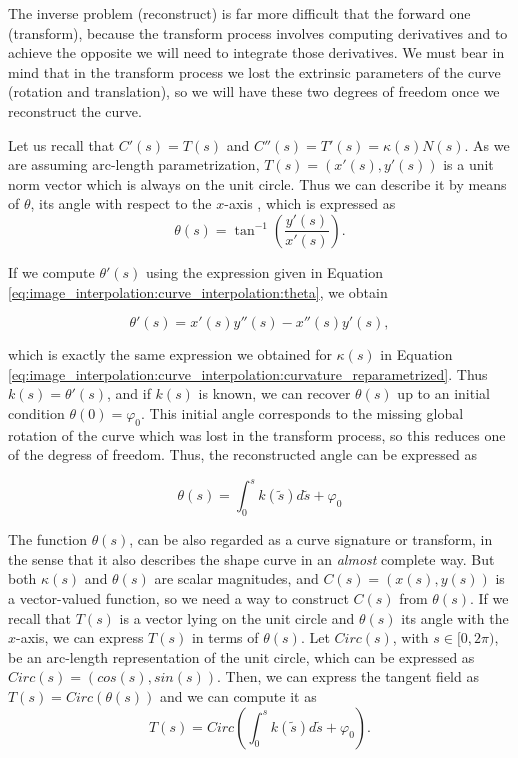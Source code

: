 \documentclass{ipol}
\begin{document}
The inverse problem (reconstruct) is far more difficult that the forward one (transform), because the transform process involves computing derivatives and to achieve the opposite we will need to integrate those derivatives. We must bear in mind that in the transform process we lost the extrinsic parameters of the curve (rotation and translation), so we will have these two degrees of freedom once we reconstruct the curve.

Let us recall that $C'(s)=T(s)$ and $C''(s)=T'(s)=\kappa(s)N(s)$. As we are assuming arc-length parametrization, $T(s)=(x'(s),y'(s))$ is a unit norm vector which is always on the unit circle. Thus we can describe it by means of $\theta$,  its angle with respect to the $x$-axis , which is expressed as
\begin{equation}
 \theta(s)=\tan^{-1}\left(\frac{y'(s)}{x'(s)}\right).
 \label{eq:image_interpolation:curve_interpolation:theta}
\end{equation}

If we compute $\theta'(s)$ using the expression given in Equation \ref{eq:image_interpolation:curve_interpolation:theta}, we obtain

\begin{equation}
 \theta'(s)=x'(s)y''(s)-x''(s)y'(s) ,
 \label{eq:image_interpolation:curve_interpolation:theta_prime}
\end{equation}

which is exactly the same expression we obtained for $\kappa(s)$ in Equation \ref{eq:image_interpolation:curve_interpolation:curvature_reparametrized}. Thus $k(s)=\theta'(s)$, and if $k(s)$ is known, we can recover $\theta(s)$ up to an initial condition $\theta(0)=\varphi_0$. This initial angle corresponds to the missing global rotation of the curve which was lost in the transform process, so this reduces one of the degress of freedom. Thus, the reconstructed angle can be expressed as

\begin{equation}
 \theta(s)=\int_0^s k(\tilde{s})d\tilde{s}+\varphi_0
  \label{eq:image_interpolation:curve_interpolation:angle_reconstruction_from_curvature}
\end{equation}

The function $\theta(s)$, can be also regarded as a curve signature or transform, in the sense that it also describes the shape curve in an \emph{almost} complete way. But both $\kappa(s)$ and $\theta(s)$ are scalar magnitudes, and $C(s)=(x(s),y(s))$ is a vector-valued function, so we need a way to construct $C(s)$ from $\theta(s)$. If we recall that $T(s)$ is a vector lying on the unit circle and $\theta(s)$ its angle with the $x$-axis, we can express $T(s)$ in terms of $\theta(s)$. Let $Circ(s)$, with $s\in[0,2\pi)$, be an arc-length representation of the unit circle, which can be expressed as $Circ(s)=(cos(s),sin(s))$. Then, we can express the tangent field as $T(s)=Circ(\theta(s))$ and we can compute it as
\begin{equation}
T(s)=Circ \left(\int_0^s k(\tilde{s})d\tilde{s}+\varphi_0 \right).
 \label{eq:image_interpolation:curve_interpolation:tangent_reconstruction}
\end{equation}
\end{document}

